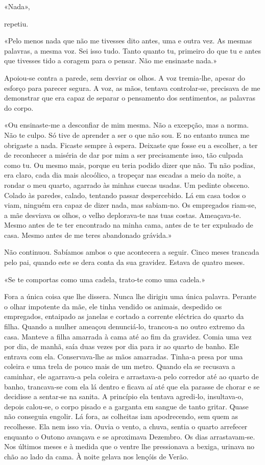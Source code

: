 «Nada»,

repetiu.

«Pelo menos nada que não me tivesses dito antes, uma e outra vez. As
mesmas palavras, a mesma voz. Sei isso tudo. Tanto quanto tu, primeiro
do que tu e antes que tivesses tido a coragem para o pensar. Não me
ensinaste nada.»

Apoiou­‑se contra a parede, sem desviar os olhos. A voz tremia­‑lhe,
apesar do esforço para parecer segura. A voz, as mãos, tentava
controlar­‑se, precisava de me demonstrar que era capaz de separar o
pensamento dos sentimentos, as palavras do corpo.

«Ou ensinaste­‑me a desconfiar de mim mesma. Não a excepção, mas a
norma. Não te culpo. Só tive de aprender a ser o que não sou. E no
entanto nunca me obrigaste a nada. Ficaste sempre à espera. Deixaste que
fosse eu a escolher, a ter de reconhecer a miséria de dar por mim a ser
precisamente isso, tão culpada como tu. Ou mesmo mais, porque eu teria
podido dizer que não. Tu não podias, era claro, cada dia mais alcoólico,
a tropeçar nas escadas a meio da noite, a rondar o meu quarto, agarrado
às minhas cuecas usadas. Um pedinte obsceno. Colado às paredes, calado,
tentando passar despercebido. Lá em casa todos o viam, ninguém era capaz
de dizer nada, mas sabiam­‑no. Os empregados riam­‑se, a mãe desviava os
olhos, o velho deplorava­‑te nas tuas costas. Ameaçava­‑te. Mesmo antes
de te ter encontrado na minha cama, antes de te ter expulsado de casa.
Mesmo antes de me teres abandonado grávida.»

Não continuou. Sabíamos ambos o que acontecera a seguir. Cinco meses
trancada pelo pai, quando este se dera conta da sua gravidez. Estava de
quatro meses.

«Se te comportas como uma cadela, trato­‑te como uma cadela.»

Fora a única coisa que lhe dissera. Nunca lhe dirigiu uma única palavra.
Perante o olhar impotente da mãe, ele tinha vendido os animais,
despedido os empregados, entaipado as janelas e cortado a corrente
eléctrica do quarto da filha. Quando a mulher ameaçou denunciá­‑lo,
trancou­‑a no outro extremo da casa. Manteve a filha amarrada à cama até
ao fim da gravidez. Comia uma vez por dia, de manhã, saía duas vezes por
dia para ir ao quarto de banho. Ele entrava com ela. Conservava­‑lhe as
mãos amarradas. Tinha­‑a presa por uma coleira e uma trela de pouco mais
de um metro. Quando ela se recusava a caminhar, ele agarrava­‑a pela
coleira e arrastava­‑a pelo corredor até ao quarto de banho,
trancava­‑se com ela lá dentro e ficava aí até que ela parasse de chorar
e se decidisse a sentar­‑se na sanita. A princípio ela tentava
agredi­‑lo, insultava­‑o, depois calou­‑se, o corpo pisado e a garganta
em sangue de tanto gritar. Quase não conseguia engolir. Lá fora, as
colheitas iam apodrecendo, sem quem as recolhesse. Ela nem isso via.
Ouvia o vento, a chuva, sentia o quarto arrefecer enquanto o Outono
avançava e se aproximava Dezembro. Os dias arrastavam­‑se. Nos últimos
meses e à medida que o ventre lhe pressionava a bexiga, urinava no chão
ao lado da cama. À noite gelava nos lençóis de Verão.

